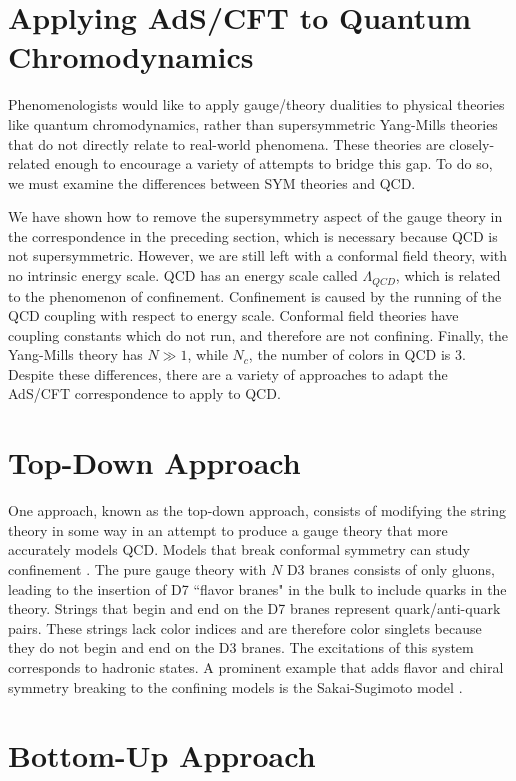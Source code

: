\section{Applying AdS/CFT to Quantum Chromodynamics}

Phenomenologists would like to apply gauge/theory dualities to physical theories like quantum chromodynamics, rather than supersymmetric Yang-Mills theories that do not directly relate to real-world phenomena.
These theories are closely-related enough to encourage a variety of attempts to bridge this gap.
To do so, we must examine the differences between SYM theories and QCD.

We have shown how to remove the supersymmetry aspect of the gauge theory in the correspondence in the preceding section, which is necessary because QCD is not supersymmetric.
However, we are still left with a conformal field theory, with no intrinsic energy scale.
QCD has an energy scale called $\Lambda_{QCD}$, which is related to the phenomenon of confinement.
Confinement is caused by the running of the QCD coupling with respect to energy scale.
Conformal field theories have coupling constants which do not run, and therefore are not confining.
Finally, the Yang-Mills theory has $N\gg 1$, while $N_c$, the number of colors in QCD is 3.
Despite these differences, there are a variety of approaches to adapt the AdS/CFT correspondence to apply to QCD.

\section{Top-Down Approach}

One approach, known as the top-down approach, consists of modifying the string theory in some way in an attempt to produce a gauge theory that more accurately models QCD.
Models that break conformal symmetry can study confinement \cite{FILL-IN}.
The pure gauge theory with $N$ D3 branes consists of only gluons, leading to the insertion of D7 ``flavor branes" in the bulk to include quarks in the theory. \cite{FILL-IN}
Strings that begin and end on the D7 branes represent quark/anti-quark pairs.
These strings lack color indices and are therefore color singlets because they do not begin and end on the D3 branes.
The excitations of this system corresponds to hadronic states.
A prominent example that adds flavor and chiral symmetry breaking to the confining models is the Sakai-Sugimoto model \cite{FILL-IN}.

\section{Bottom-Up Approach}

